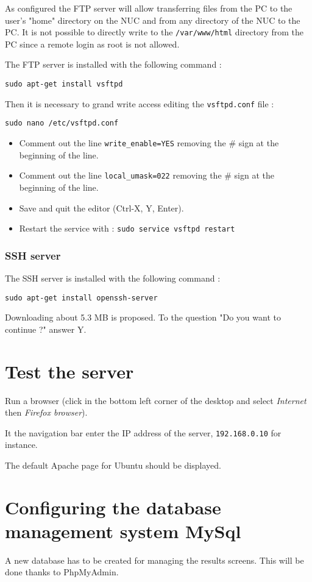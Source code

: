 \documentclass[a4paper]{ffco-rapport}
\begin{document}
		As configured the FTP server will allow transferring files from the PC to the user's "home" directory on the NUC and from any directory of the NUC to the PC.
		It is not possible to directly write to the \verb|/var/www/html| directory from the PC since a remote login as root is not allowed.
		
		The FTP server is installed with the following command :
		
		\verb|sudo apt-get install vsftpd|
		
		Then it is necessary to grand write access editing the \verb|vsftpd.conf| file :
		
		\verb|sudo nano /etc/vsftpd.conf|
		
		
		\begin{itemize}
			\item Comment out the line \verb|write_enable=YES| removing the \# sign at the beginning of the line.
			\item Comment out the line \verb|local_umask=022| removing the \# sign at the beginning of the line.
			\item Save and quit the editor (Ctrl-X, Y, Enter).
			\item Restart the service with : \verb|sudo service vsftpd restart|
		\end{itemize}
		
		
		
	\subsubsection{SSH server}
		The SSH server is installed with the following command :
		
		\verb|sudo apt-get install openssh-server|

		Downloading about 5.3 MB is proposed. To the question "Do you want to continue ?" answer Y.

\section{Test the server}
	Run a browser (click in the bottom left corner of the desktop and select \emph{Internet} then \emph{Firefox browser}).

	It the navigation bar enter the IP address of the server, \texttt{192.168.0.10} for instance.
	
	The default Apache page for Ubuntu should be displayed.
		
\section{Configuring the database management system MySql}
	A new database has to be created for managing the results screens. This will be done thanks to PhpMyAdmin.
\end{document}
